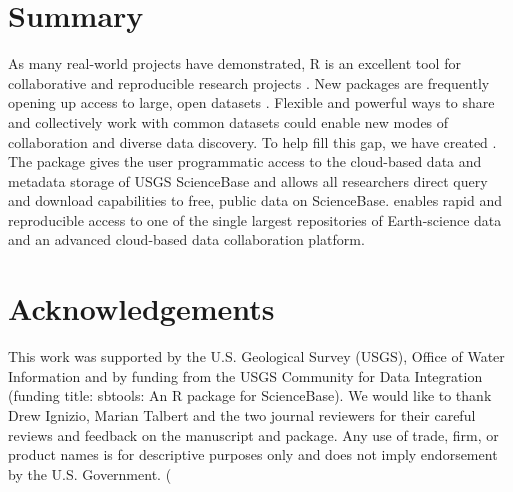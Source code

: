 \section{Summary}

As many real-world projects have demonstrated, R is
an excellent tool for collaborative and reproducible
research projects \citep{Gandrud2013}. New packages are
frequently opening up access to large, open datasets 
\citep{rNOMADS, rFDSN}. Flexible and powerful
ways to share and collectively work with common datasets
could enable new modes of collaboration and diverse data discovery.
To help fill this gap, we have created . 
The  package gives the user programmatic access to the
cloud-based data and metadata storage of USGS ScienceBase
and allows all researchers direct query and download
capabilities to free, public data on ScienceBase.
 enables rapid and reproducible
access to one of the single
largest repositories of Earth-science data and an advanced
cloud-based data collaboration platform.

\section{Acknowledgements}

This work was supported by the U.S. Geological Survey (USGS), Office of 
Water Information and by funding from the USGS Community for Data Integration
(funding title: sbtools: An R package for ScienceBase). 
We would like to thank Drew Ignizio, Marian Talbert and the two journal reviewers
for their careful reviews and feedback on the manuscript and package. Any use of trade, 
firm, or product names is for descriptive purposes only and does not imply endorsement 
by the U.S. Government.
(
